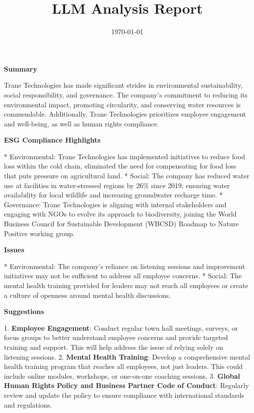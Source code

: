 \documentclass{article}
\title{LLM Analysis Report}
\date{\today}
\begin{document}
                \maketitle

                \textbf{Summary}

Trane Technologies has made significant strides in environmental sustainability, social responsibility, and governance. The company's commitment to reducing its environmental impact, promoting circularity, and conserving water resources is commendable. Additionally, Trane Technologies prioritizes employee engagement and well-being, as well as human rights compliance.

\textbf{ESG Compliance Highlights}

* Environmental: Trane Technologies has implemented initiatives to reduce food loss within the cold chain, eliminated the need for compensating for food loss that puts pressure on agricultural land.
* Social: The company has reduced water use at facilities in water-stressed regions by 26\% since 2019, ensuring water availability for local wildlife and increasing groundwater recharge time.
* Governance: Trane Technologies is aligning with internal stakeholders and engaging with NGOs to evolve its approach to biodiversity, joining the World Business Council for Sustainable Development (WBCSD) Roadmap to Nature Positive working group.

\textbf{Issues}

* Environmental: The company's reliance on listening sessions and improvement initiatives may not be sufficient to address all employee concerns.
* Social: The mental health training provided for leaders may not reach all employees or create a culture of openness around mental health discussions.

\textbf{Suggestions}

1. \textbf{Employee Engagement}: Conduct regular town hall meetings, surveys, or focus groups to better understand employee concerns and provide targeted training and support. This will help address the issue of relying solely on listening sessions.
2. \textbf{Mental Health Training}: Develop a comprehensive mental health training program that reaches all employees, not just leaders. This could include online modules, workshops, or one-on-one coaching sessions.
3. \textbf{Global Human Rights Policy and Business Partner Code of Conduct}: Regularly review and update the policy to ensure compliance with international standards and regulations.
\end{document}
